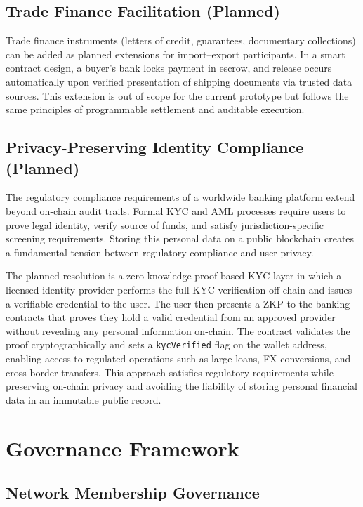 \documentclass[12pt,a4paper]{report}
\begin{document}
\subsection{Trade Finance Facilitation (Planned)}

Trade finance instruments (letters of credit, guarantees, documentary collections) can be added as planned extensions for import--export participants. In a smart contract design, a buyer's bank locks payment in escrow, and release occurs automatically upon verified presentation of shipping documents via trusted data sources. This extension is out of scope for the current prototype but follows the same principles of programmable settlement and auditable execution.

\subsection{Privacy-Preserving Identity Compliance (Planned)}
\label{sec:zkp-compliance}

The regulatory compliance requirements of a worldwide banking platform extend beyond on-chain audit trails. Formal KYC and AML processes require users to prove legal identity, verify source of funds, and satisfy jurisdiction-specific screening requirements. Storing this personal data on a public blockchain creates a fundamental tension between regulatory compliance and user privacy.

The planned resolution is a zero-knowledge proof based KYC layer in which a licensed identity provider performs the full KYC verification off-chain and issues a verifiable credential to the user. The user then presents a ZKP to the banking contracts that proves they hold a valid credential from an approved provider without revealing any personal information on-chain. The contract validates the proof cryptographically and sets a \texttt{kycVerified} flag on the wallet address, enabling access to regulated operations such as large loans, FX conversions, and cross-border transfers. This approach satisfies regulatory requirements while preserving on-chain privacy and avoiding the liability of storing personal financial data in an immutable public record.


\section{Governance Framework}

\subsection{Network Membership Governance}
\end{document}
